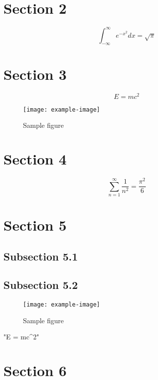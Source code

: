 \documentclass{article}
\begin{document}
\section{Section 2}

\begin{equation}
    \int_{-\infty}^{\infty} e^{-x^2} dx = \sqrt{\pi}
\end{equation}

\section{Section 3}

\begin{equation}
    E = mc^2
\end{equation}

\begin{figure}[h]
    \centering
    \texttt{[image: example-image]}
    \caption{Sample figure}
    \label{fig:sample}
\end{figure}

\section{Section 4}

\begin{equation}
    \sum_{n=1}^{\infty} \frac{1}{n^2} = \frac{\pi^2}{6}
\end{equation}

\section{Section 5}

\subsection{Subsection 5.1}

\subsection{Subsection 5.2}

\begin{figure}[h]
    \centering
    \texttt{[image: example-image]}
    \caption{Sample figure}
    \label{fig:sample}
\end{figure}
"E = mc^2"




\section{Section 6}
\end{document}
